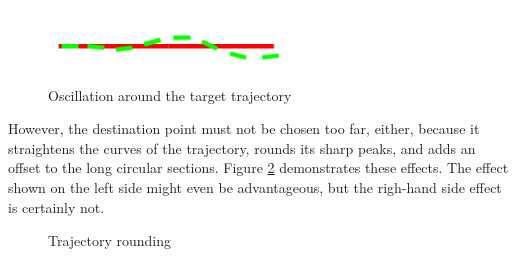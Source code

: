 \begin{figure}[!ht]
    \centering
    \includegraphics[width=65mm]{figures/raw/traj_oscillation.png}
    \caption{Oscillation around the target trajectory}
    \label{traj_oscillation}
\end{figure}

However, the destination point must not be chosen too far, either, because it straightens the curves of the trajectory, rounds its sharp peaks, and adds an offset to the long circular sections. Figure \ref{traj_rounding} demonstrates these effects. The effect shown on the left side might even be advantageous, but the righ-hand side effect is certainly not.

\begin{figure}[!ht]
    \centering
    \caption{Trajectory rounding}
    \label{traj_rounding}
\end{figure}

